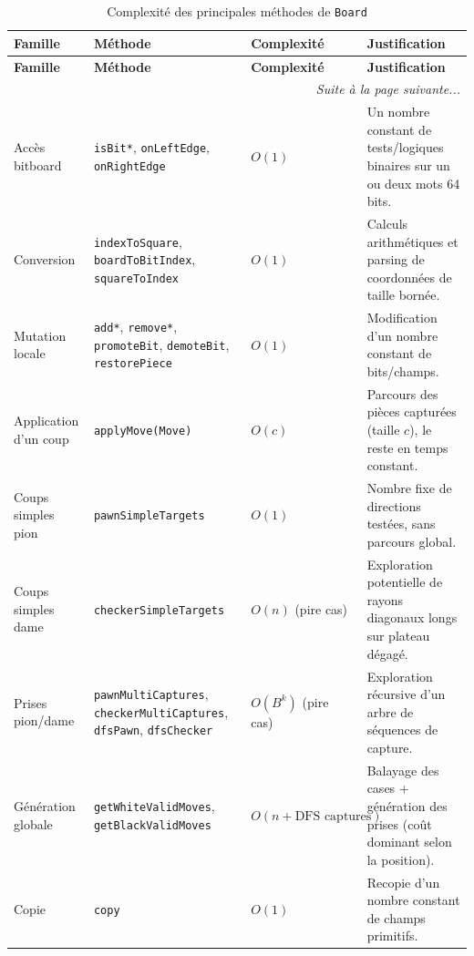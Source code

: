 \documentclass[a4paper]{article}
\begin{document}
{\footnotesize
\begin{longtable}{|p{4.0cm}|p{4.1cm}|p{2.0cm}|p{5.2cm}|}
\caption{Complexité des principales méthodes de \texttt{Board}}\label{tab:board-complexite} \\
\hline
\textbf{Famille} & \textbf{Méthode} & \textbf{Complexité} & \textbf{Justification} \\
\hline
\endfirsthead

\hline
\textbf{Famille} & \textbf{Méthode} & \textbf{Complexité} & \textbf{Justification} \\
\hline
\endhead

\hline
\multicolumn{4}{r}{\textit{Suite à la page suivante...}} \\
\endfoot

\hline
\endlastfoot

Accès bitboard
& \texttt{isBit*}, \texttt{onLeftEdge}, \texttt{onRightEdge}
& $O(1)$
& Un nombre constant de tests/logiques binaires sur un ou deux mots 64 bits. \\
\hline

Conversion
& \texttt{indexToSquare}, \texttt{boardToBitIndex}, \texttt{squareToIndex}
& $O(1)$
& Calculs arithmétiques et parsing de coordonnées de taille bornée. \\
\hline

Mutation locale
& \texttt{add*}, \texttt{remove*}, \texttt{promoteBit}, \texttt{demoteBit}, \texttt{restorePiece}
& $O(1)$
& Modification d'un nombre constant de bits/champs. \\
\hline

Application d'un coup
& \texttt{applyMove(Move)}
& $O(c)$
& Parcours des pièces capturées (taille $c$), le reste en temps constant. \\
\hline

Coups simples pion
& \texttt{pawnSimpleTargets}
& $O(1)$
& Nombre fixe de directions testées, sans parcours global. \\
\hline

Coups simples dame
& \texttt{checkerSimpleTargets}
& $O(n)$ (pire cas)
& Exploration potentielle de rayons diagonaux longs sur plateau dégagé. \\
\hline

Prises pion/dame
& \texttt{pawnMultiCaptures}, \texttt{checkerMultiCaptures}, \texttt{dfsPawn}, \texttt{dfsChecker}
& $O(B^k)$ (pire cas)
& Exploration récursive d'un arbre de séquences de capture. \\
\hline

Génération globale
& \texttt{getWhiteValidMoves}, \texttt{getBlackValidMoves}
& $O(n + \text{DFS captures})$
& Balayage des cases + génération des prises (coût dominant selon la position). \\
\hline

Copie
& \texttt{copy}
& $O(1)$
& Recopie d'un nombre constant de champs primitifs. \\
\hline
\end{longtable}
}
\end{document}
